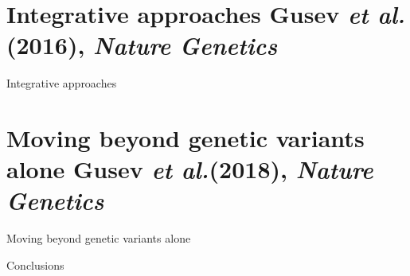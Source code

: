 \documentclass[aspectratio=169,12pt]{beamer}
\newcommand{\etal}{\textit{et al.}\xspace}
\begin{document}
\section{Integrative approaches \newline
\scriptsize Gusev \etal (2016), \textit{Nature Genetics}}

\begin{frame}{Integrative approaches}
\end{frame}

\section{Moving beyond genetic variants alone \newline
\scriptsize Gusev \etal (2018), \textit{Nature Genetics}}

\begin{frame}{Moving beyond genetic variants alone}
\end{frame}

\begin{frame}{Conclusions}
\end{frame}

\begin{frame}[allowframebreaks] %
	\frametitle{}
	\nocite{*}
	\tiny
	\printbibliography[title=References,keyword=TWAS]
\end{frame}


\end{document}
